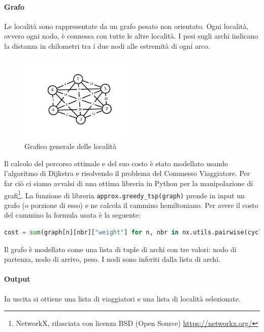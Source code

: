 \documentclass{article}
\begin{document}
\paragraph*{Grafo}
Le località sono rappresentate da un grafo pesato non orientato. Ogni località, ovvero ogni nodo, è connessa con tutte le altre località. I pesi sugli archi indicano la distanza in chilometri tra i due nodi alle estremità di ogni arco.
\begin{figure}[h]
  \centering
  \includegraphics[width=0.50\textwidth]{img/graphTot.png}
  \caption{Grafico generale delle località}\label{fig:graphTot.png}
\end{figure}
Il calcolo del percorso ottimale e del suo costo è stato modellato usando l'algoritmo di Dijkstra e risolvendo il problema del Commesso Viaggiatore. Per far ciò ci siamo avvalsi di una ottima libreria in Python per la manipolazione di grafi\footnote{NetworkX, rilasciata con licenza BSD (Open Source) \url{https://networkx.org/}}. La funzione di libreria \verb|approx.greedy_tsp(graph)| prende in input un grafo (o porzione di esso) e ne calcola il cammino hemiltoniano.
Per avere il costo del cammino la formula usata è la seguente:
\begin{lstlisting}[language=Python]
cost = sum(graph[n][nbr]["weight"] for n, nbr in nx.utils.pairwise(cycle))
\end{lstlisting}
Il grafo è modellato come una lista di tuple di archi con tre valori: nodo di partenza, nodo di arrivo, peso.
I nodi sono inferiti dalla lista di archi.
\paragraph*{Output}
In uscita si ottiene una lista di viaggiatori e una lista di località selezionate.
\end{document}
